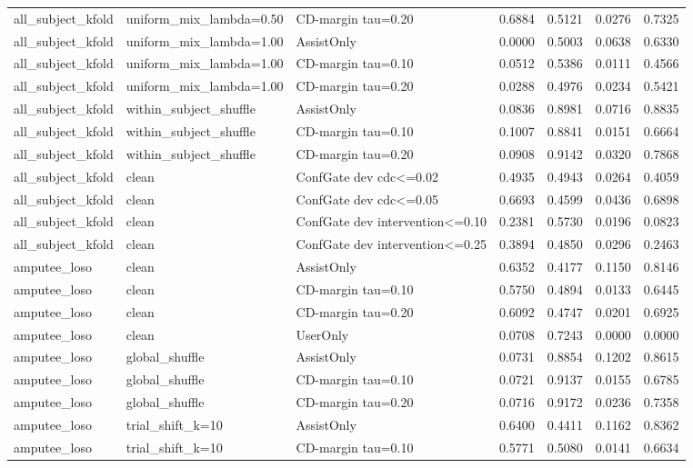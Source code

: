 \begin{table}[!t]
\begin{tabular}{lllrrrr}
all\_subject\_kfold & uniform\_mix\_lambda=0.50 & CD-margin tau=0.20 & 0.6884 & 0.5121 & 0.0276 & 0.7325 \\
all\_subject\_kfold & uniform\_mix\_lambda=1.00 & AssistOnly & 0.0000 & 0.5003 & 0.0638 & 0.6330 \\
all\_subject\_kfold & uniform\_mix\_lambda=1.00 & CD-margin tau=0.10 & 0.0512 & 0.5386 & 0.0111 & 0.4566 \\
all\_subject\_kfold & uniform\_mix\_lambda=1.00 & CD-margin tau=0.20 & 0.0288 & 0.4976 & 0.0234 & 0.5421 \\
all\_subject\_kfold & within\_subject\_shuffle & AssistOnly & 0.0836 & 0.8981 & 0.0716 & 0.8835 \\
all\_subject\_kfold & within\_subject\_shuffle & CD-margin tau=0.10 & 0.1007 & 0.8841 & 0.0151 & 0.6664 \\
all\_subject\_kfold & within\_subject\_shuffle & CD-margin tau=0.20 & 0.0908 & 0.9142 & 0.0320 & 0.7868 \\
all\_subject\_kfold & clean & ConfGate dev cdc<=0.02 & 0.4935 & 0.4943 & 0.0264 & 0.4059 \\
all\_subject\_kfold & clean & ConfGate dev cdc<=0.05 & 0.6693 & 0.4599 & 0.0436 & 0.6898 \\
all\_subject\_kfold & clean & ConfGate dev intervention<=0.10 & 0.2381 & 0.5730 & 0.0196 & 0.0823 \\
all\_subject\_kfold & clean & ConfGate dev intervention<=0.25 & 0.3894 & 0.4850 & 0.0296 & 0.2463 \\
amputee\_loso & clean & AssistOnly & 0.6352 & 0.4177 & 0.1150 & 0.8146 \\
amputee\_loso & clean & CD-margin tau=0.10 & 0.5750 & 0.4894 & 0.0133 & 0.6445 \\
amputee\_loso & clean & CD-margin tau=0.20 & 0.6092 & 0.4747 & 0.0201 & 0.6925 \\
amputee\_loso & clean & UserOnly & 0.0708 & 0.7243 & 0.0000 & 0.0000 \\
amputee\_loso & global\_shuffle & AssistOnly & 0.0731 & 0.8854 & 0.1202 & 0.8615 \\
amputee\_loso & global\_shuffle & CD-margin tau=0.10 & 0.0721 & 0.9137 & 0.0155 & 0.6785 \\
amputee\_loso & global\_shuffle & CD-margin tau=0.20 & 0.0716 & 0.9172 & 0.0236 & 0.7358 \\
amputee\_loso & trial\_shift\_k=10 & AssistOnly & 0.6400 & 0.4411 & 0.1162 & 0.8362 \\
amputee\_loso & trial\_shift\_k=10 & CD-margin tau=0.10 & 0.5771 & 0.5080 & 0.0141 & 0.6634 \\

\end{tabular}
\end{table}
